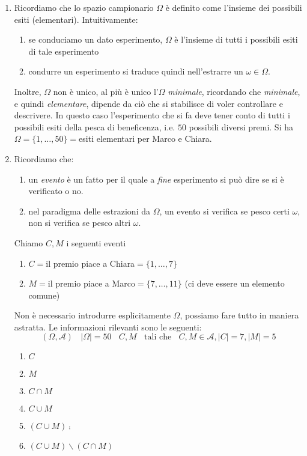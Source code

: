 \begin{enumerate}
\item Ricordiamo che lo spazio campionario $\Omega $ è definito come l'insieme dei possibili esiti (elementari). Intuitivamente:
\begin{enumerate}
\item se conduciamo un dato esperimento, $\Omega $ è l'insieme di tutti i possibili esiti di tale esperimento
\item condurre un esperimento si traduce quindi nell'estrarre un $\omega \in \Omega $.
\end{enumerate}

Inoltre, $\Omega $ non è unico, al più è unico l'$\Omega $ \textit{minimale}, ricordando che \textit{minimale}, e quindi \textit{elementare}, dipende da ciò che si stabilisce di voler controllare e descrivere. In questo caso l'esperimento che si fa deve tener conto di tutti i possibili esiti della pesca di beneficenza, i.e. $50$ possibili diversi premi. Si ha $\Omega =\{1,\dots ,50\} =$esiti elementari per Marco e Chiara.
\item Ricordiamo che:
\begin{enumerate}
\item un \textit{evento} è un fatto per il quale a \textit{fine} esperimento si può dire se si è verificato o no.
\item nel paradigma delle estrazioni da $\Omega $, un evento si verifica se pesco certi $\omega $, non si verifica se pesco altri $\omega $.
\end{enumerate}

Chiamo $C,M$ i seguenti eventi
\begin{enumerate}
\item $C=$il premio piace a Chiara$=\{1,\dots ,7\}$
\item $M=$il premio piace a Marco$=\{7,\dots ,11\}$ (ci deve essere un elemento comune)
\end{enumerate}

\begin{oss}
Non è necessario introdurre esplicitamente $\Omega $, possiamo fare tutto in maniera astratta. Le informazioni rilevanti sono le seguenti:\begin{equation*}
( \Omega ,\mathcal{A}) \ \ \ \ | \Omega | =50\ \ \ \ C,M\ \ \ \ \text{tali che} \ \ \ \ C,M\in \mathcal{A} ,| C| =7,| M| =5
\end{equation*}
\end{oss}
\begin{enumerate}
\item $C$
\item $M$
\item $C\cap M$
\item $C\cup M$
\item $( C\cup M)\comp$
\item $( C\cup M) \smallsetminus ( C\cap M)$
\end{enumerate}




\end{enumerate}
